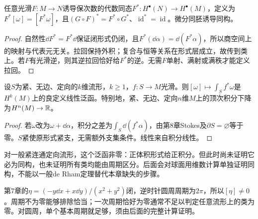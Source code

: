 \begin{proposition}[拉回的反变性]\label{prop:cohomology-pullback}
任意光滑$F:M\to N$诱导保次数的代数同态$F^*:H^\bullet(N)\to H^\bullet(M)$，定义为$F^*[\omega]=[F^*\omega]$，且$(G\circ F)^*=F^*\circ G^*$、$\operatorname{id}^*=\operatorname{id}$。微分同胚诱导同构。
\end{proposition}
\begin{proof}
自然性$\dd F^*=F^*\dd$保证闭形式仍闭，且$F^*(\dd\alpha)=\dd(F^*\alpha)$，所以商空间上的映射与代表元无关。拉回保持外积；复合与恒等关系在形式层成立，故传到类上。若$F$有光滑逆，则其逆拉回恰好给$F^*$的逆。无需$F$单射、满射或满秩才能定义拉回。
\end{proof}

\begin{proposition}[周期检验与顶次积分]\label{prop:cohomology-period}
设$S$为紧、无边、定向的$k$维流形，$k\geq1$，$f:S\to M$光滑。则$[\omega]\mapsto\int_S f^*\omega$是$H^k(M)$上的良定义线性泛函。特别地，紧、无边、定向$n$维$M$上的顶次积分下降为$H^n(M)\to\mathbb{R}$。
\end{proposition}
\begin{proof}
若$\omega$改为$\omega+\dd\alpha$，积分之差为$\int_S\dd(f^*\alpha)$，由第8章Stokes及$\partial S=\varnothing$等于零。$S$紧使原形式紧支，无需额外支集条件。线性来自积分线性。
\end{proof}
对一般紧连通定向流形，这个泛函非零：正体积形式给正积分。但此时尚未证明它必为同构，也未证明所有类均能由周期区分。后面会对球面用维数计算单独证明同构，不能以一般de Rham定理替代本章缺失的步骤。
\begin{example}[穿孔平面上的非零类]
第7章的$\eta=(-y\dd x+x\dd y)/(x^2+y^2)$闭，逆时针圆周周期为$2\pi$，所以$[\eta]\ne0$。周期不为零能够排除恰当；一次周期恰好为零通常不足以判定任意流形上的类为零。对圆周，单个基本周期就足够，须由后面的完整计算证明。
\end{example}
